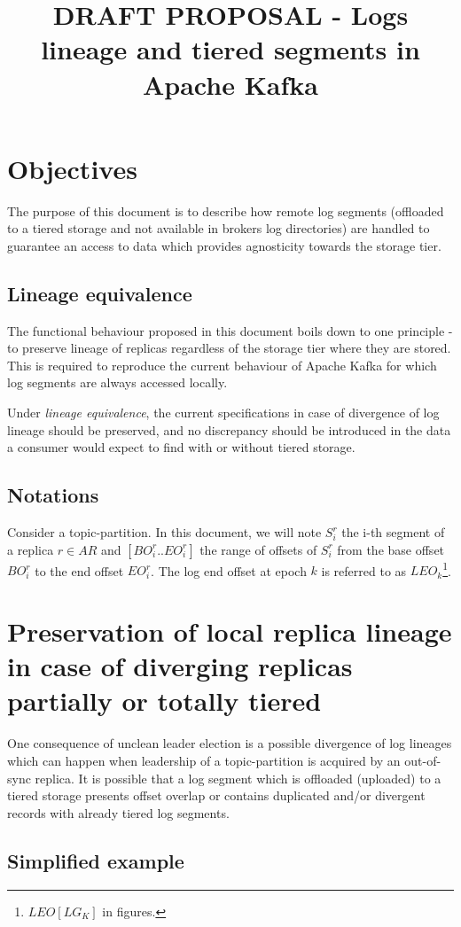 \documentclass{article}
\title{DRAFT PROPOSAL - Logs lineage and tiered segments in Apache Kafka}
\begin{document}
\section{Objectives}
The purpose of this document is to describe how remote log segments (offloaded to a tiered storage and not available in brokers log directories) are handled to guarantee an access to data which provides agnosticity towards the storage tier.

\subsection{Lineage equivalence}

The functional behaviour proposed in this document boils down to one principle - to preserve lineage of replicas regardless of the storage tier where they are stored. This is required to reproduce the current behaviour of Apache Kafka for which log segments are always accessed locally.

Under \textit{lineage equivalence}, the current specifications in case of divergence of log lineage should be preserved, and no discrepancy should be introduced in the data a consumer would expect to find with or without tiered storage.

\subsection{Notations}
Consider a topic-partition. In this document, we will note $S_i^r$ the i-th segment of a replica $r \in AR$ and $[BO_i^r..EO_i^r]$ the range of offsets of $S_i^r$ from the base offset $BO_i^r$ to the end offset $EO_i^r$. The log end offset at epoch $k$ is referred to as $LEO_k$\footnote{$LEO[LG_K]$ in figures.}.

\section{Preservation of local replica lineage in case of diverging replicas partially or totally tiered}

One consequence of unclean leader election is a possible divergence of log lineages which can happen when leadership of a topic-partition is acquired by an out-of-sync replica. It is possible that a log segment which is offloaded (uploaded) to a tiered storage presents offset overlap or contains duplicated and/or divergent records with already tiered log segments.

\subsection{Simplified example}
\end{document}
